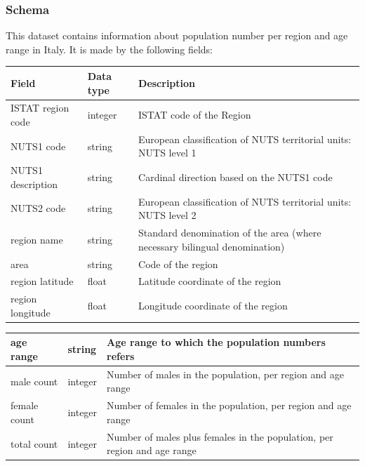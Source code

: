 \documentclass{article}
\begin{document}
\subsubsection{Schema}
This dataset contains information about population number per region and age range in Italy. It is made by the following fields:
\hfill\break
\begin{center}
\begin{tabular}{ |m{4cm}|m{2cm}|m{4.5cm}|}
  \hline
  \bfseries{Field} & \bfseries{Data type} & \bfseries{Description} \\
  \hline\hline
  ISTAT region code & integer & ISTAT code of the Region\\
  \hline
  NUTS1 code & string & European classification of NUTS territorial units: NUTS level 1\\
    \hline
      NUTS1 description & string & Cardinal direction based on the NUTS1 code\\
    \hline
          NUTS2 code & string & European classification of NUTS territorial units: NUTS level 2\\
              \hline
                        region name & string & Standard denomination of the area (where necessary bilingual denomination)\\
                        \hline
          area & string & Code of the region\\
                        \hline
          region latitude & float & Latitude coordinate of the region\\
                        \hline
          region longitude & float & Longitude coordinate of the region\\
    \hline
    
\end{tabular}
\end{center}

\newpage
\begin{center}
\begin{tabular}{ |m{4cm}|m{2cm}|m{4.5cm}|}
\hline
  age range & string & Age range to which the population numbers refers\\ 
    \hline
  male count & integer & Number of males in the population, per region and age range\\
    \hline

  female count & integer & Number of females in the population, per region and age range\\ 
    \hline
  total count & integer & Number of males plus females in the population, per region and age range\\ 
    \hline
  \end{tabular}
\end{center}
\hfill\break
\end{document}
